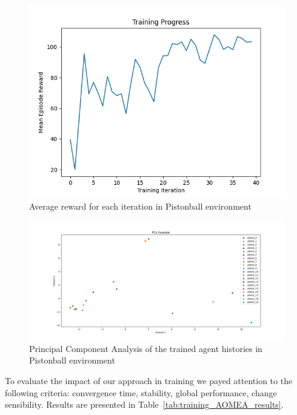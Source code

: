 \documentclass[runningheads]{llncs}
\begin{document}
\begin{figure}[h!]
    \centering
    \includegraphics[width=\textwidth]{figures/prahom_learning_curve.png}
    \caption{Average reward for each iteration in Pistonball environment}
    \label{fig:prahom_learning_curve}
\end{figure}

\begin{figure}[h!]
    \centering
    \includegraphics[width=\textwidth]{figures/prahom_pca_analysis.png}
    \caption{Principal Component Analysis of the trained agent histories in Pistonball environment}
    \label{fig:prahom_pca_analysis}
\end{figure}

To evaluate the impact of our approach in training we payed attention to the following criteria: convergence time, stability, global performance, change sensibility. Results are presented in Table~\ref{tab:training_AOMEA_results}.


\end{document}
